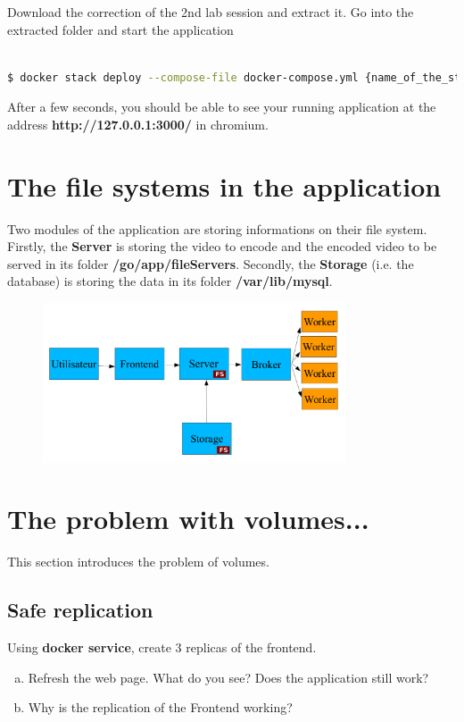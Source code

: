 \documentclass[a4paper,11pt]{exam}
\begin{document}
Download the correction of the 2nd lab session and extract it. Go into 
the extracted folder and start the application

\begin{lstlisting}[frame=single,language={sh}]  % Start your code-block

$ docker stack deploy --compose-file docker-compose.yml {name_of_the_stack}
\end{lstlisting}

After a few seconds, you should be able to see your running application at the address \textbf{http://127.0.0.1:3000/} in chromium.




\section{The file systems in the application}

Two modules of the application are storing informations on their file system. 
Firstly, the \textbf{Server} is storing the video to encode and the encoded video
 to be served in its folder \textbf{/go/app/fileServers}. Secondly, the \textbf{Storage}
 (i.e. the database) is storing the data in its folder \textbf{/var/lib/mysql}. 

 \begin{figure}[!ht]
	\centering
	\includegraphics[width=0.8\textwidth]{fig/architecture.png}
	\label{fig:architecture}
\end{figure}

\section{The problem with volumes...}

This section introduces the problem of volumes.




\subsection{Safe replication}
\begin{questions}
	\question Using \textbf{docker service}, create 3 replicas of the frontend.
	\begin{enumerate}[(a)]
		\item Refresh the web page. What do you see? Does the application still work?
		\item Why is the replication of the Frontend working?
	\end{enumerate}
\end{questions}
\end{document}
